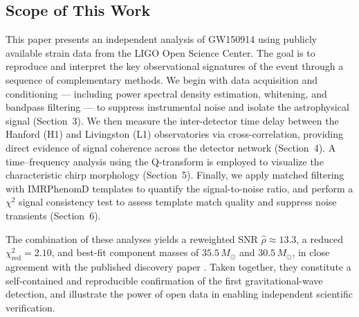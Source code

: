 \subsection*{Scope of This Work}

This paper presents an independent analysis of GW150914 using publicly available strain data from
the LIGO Open Science Center. The goal is to reproduce and interpret the key observational
signatures of the event through a sequence of complementary methods. We begin with data
acquisition and conditioning --- including power spectral density estimation, whitening, and
bandpass filtering --- to suppress instrumental noise and isolate the astrophysical signal
(Section~3). We then measure the inter-detector time delay between the Hanford (H1) and
Livingston (L1) observatories via cross-correlation, providing direct evidence of signal coherence
across the detector network (Section~4). A time--frequency analysis using the Q-transform is
employed to visualize the characteristic chirp morphology (Section~5). Finally, we apply matched
filtering with IMRPhenomD templates to quantify the signal-to-noise ratio, and perform a
$\chi^2$ signal consistency test to assess template match quality and suppress noise transients
(Section~6).

The combination of these analyses yields a reweighted SNR $\hat{\rho} \approx 13.3$, a reduced
$\chi^2_{\mathrm{red}} = 2.10$, and best-fit component masses of $35.5\,M_\odot$ and
$30.5\,M_\odot$, in close agreement with the published discovery paper \cite{Abbott2016Discovery}. Taken
together, they constitute a self-contained and reproducible confirmation of the first
gravitational-wave detection, and illustrate the power of open data in enabling independent
scientific verification.